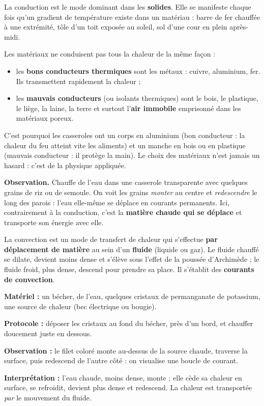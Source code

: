 \documentclass[11pt]{article}
\newcommand{\cle}[1]{{\popxbold\color{popdark}#1}}
\newcounter{popsec}
\newcounter{popsub}
\newcommand{\courssub}[1]{%
  \stepcounter{popsub}%
  \par\vspace{9pt}\noindent{\popxbold\fontsize{11.5}{13}\selectfont\color{popink}{\color{poporange}\thepopsec.\thepopsub}\hspace{6pt}#1}\par\nopagebreak\vspace{4pt}
}
\begin{document}
La conduction est le mode dominant dans les \textbf{solides}. Elle se manifeste chaque fois qu'un gradient de température existe dans un matériau : barre de fer chauffée à une extrémité, tôle d'un toit exposée au soleil, sol d'une cour en plein après-midi.

\begin{propriete}
Les matériaux ne conduisent pas tous la chaleur de la même façon :
\begin{itemize}
\item les \textbf{bons conducteurs thermiques} sont les métaux : cuivre, aluminium, fer. Ils transmettent rapidement la chaleur ;
\item les \textbf{mauvais conducteurs} (ou \cle{isolants thermiques}) sont le bois, le plastique, le liège, la laine, la terre et surtout l'\textbf{air immobile} emprisonné dans les matériaux poreux.
\end{itemize}
\end{propriete}

C'est pourquoi les casseroles ont un corps en aluminium (bon conducteur : la chaleur du feu atteint vite les aliments) et un manche en bois ou en plastique (mauvais conducteur : il protège la main). Le choix des matériaux n'est jamais un hasard : c'est de la physique appliquée.

\courssub{La convection thermique}

\textbf{Observation.} Chauffe de l'eau dans une casserole transparente avec quelques grains de riz ou de semoule. On voit les grains \emph{monter} au centre et \emph{redescendre} le long des parois : l'eau elle-même se déplace en courants permanents. Ici, contrairement à la conduction, c'est la \textbf{matière chaude qui se déplace} et transporte son énergie avec elle.

\begin{definition}
La \cle{convection} est un mode de transfert de chaleur qui s'effectue \textbf{par déplacement de matière} au sein d'un \textbf{fluide} (liquide ou gaz). Le fluide chauffé se dilate, devient moins dense et s'élève sous l'effet de la poussée d'Archimède ; le fluide froid, plus dense, descend pour prendre sa place. Il s'établit des \textbf{courants de convection}.
\end{definition}

\begin{experience}
\textbf{Matériel :} un bécher, de l'eau, quelques cristaux de permanganate de potassium, une source de chaleur (bec électrique ou bougie).\par
\textbf{Protocole :} déposer les cristaux au fond du bécher, près d'un bord, et chauffer doucement juste en dessous.\par
\textbf{Observation :} le filet coloré monte au-dessus de la source chaude, traverse la surface, puis redescend de l'autre côté : on visualise une boucle de courant.\par
\textbf{Interprétation :} l'eau chaude, moins dense, monte ; elle cède sa chaleur en surface, se refroidit, devient plus dense et redescend. La chaleur est transportée \emph{par} le mouvement du fluide.
\end{experience}
\end{document}
